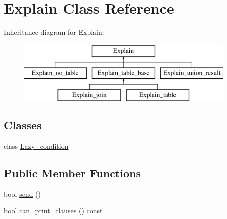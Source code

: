 \hypertarget{classExplain}{}\section{Explain Class Reference}
\label{classExplain}
Inheritance diagram for Explain\+:\begin{figure}[H]
\begin{center}
\leavevmode
\includegraphics[height=3.000000cm]{classExplain}
\end{center}
\end{figure}
\subsection*{Classes}
\begin{DoxyCompactItemize}
\item 
class \mbox{\hyperlink{classExplain_1_1Lazy__condition}{Lazy\+\_\+condition}}
\end{DoxyCompactItemize}
\subsection*{Public Member Functions}
\begin{DoxyCompactItemize}
\item 
bool \mbox{\hyperlink{classExplain_ad8b4ddd375a711b59d6d9b50d84f2cf2}{send}} ()
\item 
bool \mbox{\hyperlink{classExplain_ab2986073fdc10607ccf78b84fd0a8451}{can\+\_\+print\+\_\+clauses}} () const
\end{DoxyCompactItemize}
